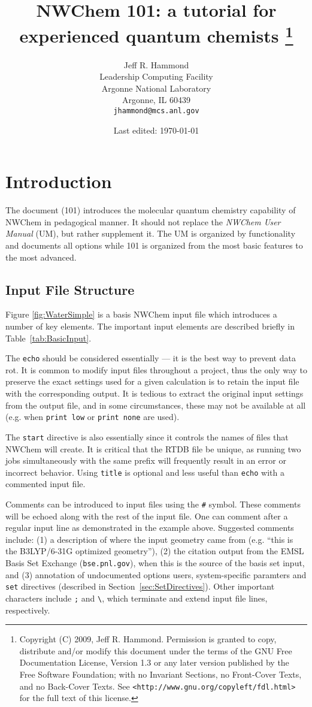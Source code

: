 \documentclass[letterpaper,12pt]{article}
\title{NWChem 101: a tutorial for experienced quantum chemists
       \footnote{
Copyright (C) 2009, Jeff R. Hammond. Permission is granted to copy, distribute and/or modify this document under the terms of the GNU Free Documentation License, Version 1.3 or any later version published by the Free Software Foundation; with no Invariant Sections, no Front-Cover Texts, and no Back-Cover Texts. See \texttt{<http://www.gnu.org/copyleft/fdl.html>} for the full text of this license.
       }
}
\author{Jeff R. Hammond \\
        Leadership Computing Facility \\
        Argonne National Laboratory \\
        Argonne, IL 60439 \\
        \texttt{jhammond@mcs.anl.gov}}
\date{Last edited: \today}
\begin{document}
\maketitle

% 

\section{Introduction}\label{sec:Introduction}

The document (101) introduces the molecular quantum chemistry capability of NWChem in pedagogical manner.  It should not replace the \textit{NWChem User Manual} (UM), but rather supplement it.  The UM is organized by functionality and documents all options while 101 is organized from the most basic features to the most advanced.

\newpage

\subsection{Input File Structure}\label{sec:InputFileStructure}

Figure \ref{fig:WaterSimple} is a basis NWChem input file which introduces a number of key elements.  The important input elements are described briefly in Table~\ref{tab:BasicInput}.

The \texttt{echo} should be considered essentially --- it is the best way to prevent data rot.  It is common to modify input files throughout a project, thus the only way to preserve the exact settings used for a given calculation is to retain the input file with the corresponding output.  It is tedious to extract the original input settings from the output file, and in some circumstances, these may not be available at all (e.g. when \texttt{print low} or \texttt{print none} are used).

The \texttt{start} directive is also essentially since it controls the names of files that NWChem will create.  It is critical that the RTDB file be unique, as running two jobs simultaneously with the same prefix will frequently result in an error or incorrect behavior.  Using \texttt{title} is optional and less useful than \texttt{echo} with a commented input file.

Comments can be introduced to input files using the \texttt{\#} symbol.  These comments will be echoed along with the rest of the input file.  One can comment after a regular input line as demonstrated in the example above.  Suggested comments include: (1) a description of where the input geometry came from (e.g. ``this is the B3LYP/6-31G optimized geometry''), (2) the citation output from the EMSL Basis Set Exchange (\texttt{bse.pnl.gov}), when this is the source of the basis set input, and (3) annotation of undocumented options users, system-specific paramters and \texttt{set} directives (described in Section~\ref{sec:SetDirectives}).  Other important characters include \verb";" and \verb"\", which terminate and extend input file lines, respectively.
\end{document}
